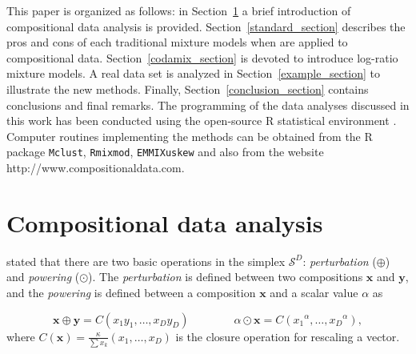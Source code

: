 \documentclass[12pt, a4paper]{article}
\begin{document}
This paper is organized as follows: in Section~\ref{coda_section} a brief introduction of compositional data analysis is provided. Section~\ref{standard_section} describes the pros and cons of each traditional mixture models when are applied to compositional data. Section~\ref{codamix_section} is devoted to introduce log-ratio mixture models. A real data set is analyzed in Section~\ref{example_section} to illustrate the new methods. Finally, Section~\ref{conclusion_section} contains conclusions and final remarks. The programming of the data analyses discussed in this work has been conducted using the open-source R statistical environment \citep{R2014soft}. Computer routines implementing the methods can be obtained from the R package \texttt{Mclust}, \texttt{Rmixmod}, \texttt{EMMIXuskew} and also from the website http://www.compositionaldata.com.






\section{Compositional data analysis}
\label{coda_section}


 \noindent \cite{aitchison1986statistical} stated that  there are two basic operations in the simplex $\mathcal{S}^D$: \emph{perturbation} ($\oplus$) and 
 \emph{powering} ($\odot$). The \emph{perturbation} is defined between two compositions $\textbf{x}$ 
and $\textbf{y}$,  and the \emph{powering} is defined between a composition $\textbf{x}$ and a scalar value $\alpha$ as

\begin{equation}
\textbf{x} \oplus \textbf{y} =  C( x_1 y_1, \dots, x_D y_D) \qquad\qquad \alpha
 \odot \textbf{x} =  C( {x_1}^\alpha, \dots, {x_D}^\alpha),
\label{pert_pow}
\end{equation}
where $C(\textbf{x})=\frac{\kappa}{\sum x_k}(x_1, \dots, x_D) $ is the closure operation for rescaling a vector.
\end{document}
